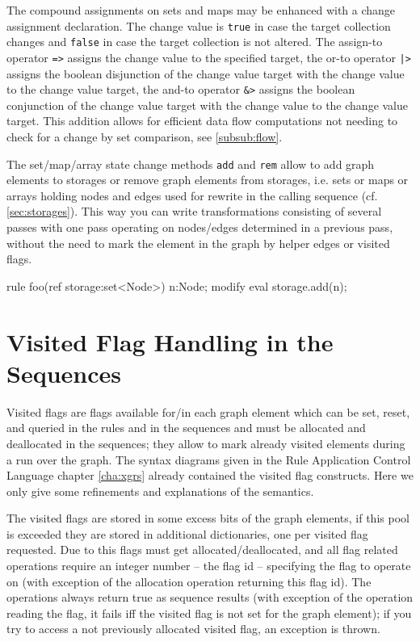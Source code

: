 The compound assignments on sets and maps may be enhanced with a change assignment declaration.
The change value is \texttt{true} in case the target collection changes and \texttt{false} in case the target collection is not altered.
The assign-to operator \verb#=># assigns the change value to the specified target, the or-to operator \verb#|># assigns the boolean disjunction of the change value target with the change value to the change value target, the and-to operator \verb#&># assigns the boolean conjunction of the change value target with the change value to the change value target.
This addition allows for efficient data flow computations not needing to check for a change by set comparison, see \ref{subsub:flow}.


\begin{example}
The set/map/array state change methods \texttt{add} and \texttt{rem} allow to add graph elements to storages or remove graph elements from storages, i.e. sets or maps or arrays holding nodes and edges used for rewrite in the calling sequence (cf. \ref{sec:storages}).
This way you can write transformations consisting of several passes with one pass operating on nodes/edges determined in a previous pass,
without the need to mark the element in the graph by helper edges or visited flags.
	\begin{grgen}
rule foo(ref storage:set<Node>)
{
  n:Node;
  modify {
    eval {
      storage.add(n);
    }
  }
}
	\end{grgen}
\end{example}



\section{Visited Flag Handling in the Sequences}\label{sec:visited}

Visited flags are flags available for/in each graph element which can be set, reset, and queried in the rules and in the sequences and must be allocated and deallocated in the sequences;
they allow to mark already visited elements during a run over the graph.
The syntax diagrams given in the Rule Application Control Language chapter \ref{cha:xgrs} already contained the visited flag constructs.
Here we only give some refinements and explanations of the semantics.

The visited flags are stored in some excess bits of the graph elements, if this pool is exceeded they are stored in additional dictionaries, one per visited flag requested.
Due to this flags must get allocated/deallocated, and all flag related operations require an integer number -- the flag id -- specifying the flag to operate on (with exception of the allocation operation returning this flag id).
The operations always return true as sequence results (with exception of the operation reading the flag, it fails iff the visited flag is not set for the graph element);
if you try to access a not previously allocated visited flag, an exception is thrown.

